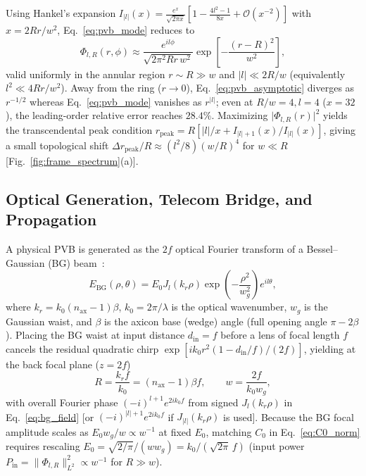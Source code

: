\documentclass[aps,pra,reprint,amsmath,amssymb,floatfix,longbibliography]{revtex4-2}
\providecommand{\abs}[1]{\lvert#1\rvert}
\providecommand{\norm}[1]{\lVert#1\rVert}
\begin{document}
Using Hankel's expansion $I_{\abs{l}}(x) = \frac{e^x}{\sqrt{2\pi x}}[1 - \frac{4l^2-1}{8x} + \mathcal{O}(x^{-2})]$ with $x = 2Rr/w^2$, Eq.~\eqref{eq:pvb_mode} reduces to~\cite{Ferreira2026}
\begin{equation}
\Phi_{l,R}(r,\phi) \approx \frac{e^{il\phi}}{\sqrt{2\pi^2 R r\, w^2}} \exp\!\left[-\frac{(r - R)^2}{w^2}\right],
\label{eq:pvb_asymptotic}
\end{equation}
valid uniformly in the annular region $r \sim R \gg w$ and $\abs{l} \ll 2R/w$ (equivalently $l^2 \ll 4Rr/w^2$). Away from the ring ($r \to 0$), Eq.~\eqref{eq:pvb_asymptotic} diverges as $r^{-1/2}$ whereas Eq.~\eqref{eq:pvb_mode} vanishes as $r^{\abs{l}}$; even at $R/w = 4, l = 4$ ($x=32$), the leading-order relative error reaches $28.4\%$. Maximizing $\abs{\Phi_{l,R}(r)}^2$ yields the transcendental peak condition $r_{\mathrm{peak}} = R[\abs{l}/x + I_{\abs{l}+1}(x)/I_{\abs{l}}(x)]$, giving a small topological shift $\Delta r_{\mathrm{peak}}/R \approx (l^2/8)(w/R)^4$ for $w \ll R$ [Fig.~\ref{fig:frame_spectrum}(a)].

\subsection{Optical Generation, Telecom Bridge, and Propagation}
\label{subsec:pvb_generation}

A physical PVB is generated as the $2f$ optical Fourier transform of a Bessel--Gaussian (BG) beam~\cite{Gori1987,Vaity2015}:
\begin{equation}
E_{\mathrm{BG}}(\rho,\theta) = E_0 J_l(k_r\rho)\exp\!\left(-\frac{\rho^2}{w_g^2}\right) e^{il\theta},
\label{eq:bg_field}
\end{equation}
where $k_r = k_0(n_{\mathrm{ax}}-1)\beta$, $k_0 = 2\pi/\lambda$ is the optical wavenumber, $w_g$ is the Gaussian waist, and $\beta$ is the axicon base (wedge) angle (full opening angle $\pi - 2\beta$). Placing the BG waist at input distance $d_{\mathrm{in}} = f$ before a lens of focal length $f$ cancels the residual quadratic chirp $\exp[i k_0 r^2(1-d_{\mathrm{in}}/f)/(2f)]$, yielding at the back focal plane ($z=2f$)~\cite{Vaity2015,Villalba2023}
\begin{equation}
R = \frac{k_r f}{k_0} = (n_{\mathrm{ax}}-1)\beta f, \qquad w = \frac{2f}{k_0 w_g},
\label{eq:fourier_parameters}
\end{equation}
with overall Fourier phase $(-i)^{l+1} e^{2ik_0 f}$ from signed $J_l(k_r\rho)$ in Eq.~\eqref{eq:bg_field} [or $(-i)^{\abs{l}+1} e^{2ik_0 f}$ if $J_{\abs{l}}(k_r\rho)$ is used]. Because the BG focal amplitude scales as $E_0 w_g / w \propto w^{-1}$ at fixed $E_0$, matching $C_0$ in Eq.~\eqref{eq:C0_norm} requires rescaling $E_0 = \sqrt{2/\pi}/(w w_g) = k_0/(\sqrt{2\pi}\,f)$ (input power $P_{\mathrm{in}} = \norm{\Phi_{l,R}}_{L^2}^2 \propto w^{-1}$ for $R \gg w$).
\end{document}
